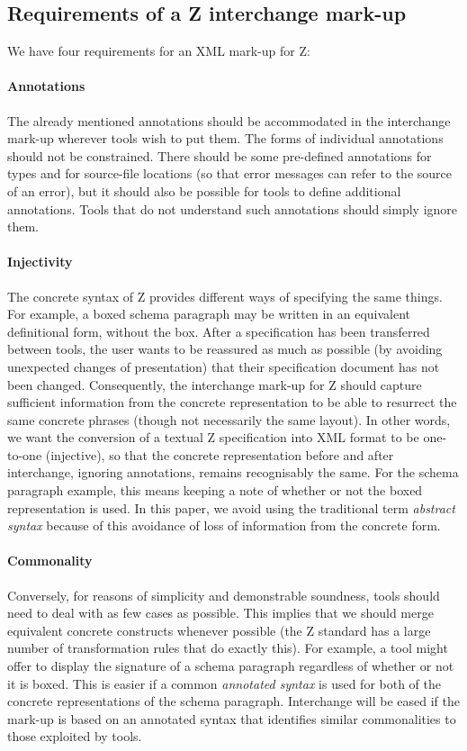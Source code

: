 \documentclass{llncs}  %
\begin{document}
\subsection{Requirements of a Z interchange mark-up}\label{injectivity}

We have four requirements for an XML mark-up for Z:
 
\paragraph{Annotations}
The already mentioned annotations should be accommodated
in the interchange mark-up wherever tools wish to put them.
The forms of individual annotations should not be constrained.
There should be some pre-defined annotations for types and for
source-file locations (so that error messages can refer to the
source of an error), but it should also be possible for tools
to define additional annotations.  Tools that do not understand
such annotations should simply ignore them.

\paragraph{Injectivity}
The concrete syntax of Z provides different ways of specifying the 
same things.  For example, a boxed schema paragraph
may be written in an equivalent definitional form, without the box.
After a specification has been transferred between tools, the user wants
to be reassured as much as possible (by avoiding unexpected changes 
of presentation) that their specification document has not been changed.
Consequently, the interchange mark-up for Z should capture
sufficient information from the concrete representation 
to be able to resurrect the same concrete phrases
(though not necessarily the same layout).
In other words, we want the conversion of a textual Z specification into 
XML format to be one-to-one (injective), so that the concrete 
representation before and after interchange, ignoring annotations,
remains recognisably the same.
For the schema paragraph example, this means keeping a note of whether 
or not the boxed representation is used. 
In this paper, we avoid using the traditional term \textit{abstract syntax}
because of this avoidance of loss of information from the concrete form.

\paragraph{Commonality}
Conversely, for reasons of simplicity and demonstrable soundness, 
tools should need to deal with as few cases as possible.  This implies
that we should merge equivalent concrete constructs whenever possible
(the Z standard has a large number of transformation rules that do
exactly this).
For example, a tool might offer to display the signature 
of a schema paragraph regardless of whether or not it is boxed.
This is easier if a common \textit{annotated syntax} is used
for both of the concrete representations of the schema paragraph.
Interchange will be eased if the mark-up is based on an annotated syntax
that identifies similar commonalities to those exploited by tools.
\end{document}
